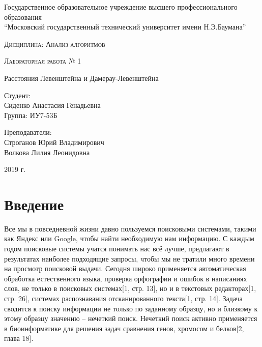 \documentclass[a4paper,14pt]{article} %
\newcommand{\anonsection}[1]{\section*{#1}\addcontentsline{toc}{section}{#1}}
\begin{document}
	\begin{titlepage}

       		\begin{center}
         		\large
		
        			Государственное образовательное учреждение высшего профессионального образования\\
       			“Московский государственный технический университет имени Н.Э.Баумана”
         		\vspace{3cm}
            
            		\textsc{Дисциплина: Анализ алгоритмов}
           		\vspace{0.5cm}
                
            		\textsc{Лабораторная работа № 1}
           		 \vspace{3cm}
            
           		 \LARGE 
		 
		 	Расстояния Левенштейна и Дамерау-Левенштейна
           		 \vspace{3cm}
            
            		\begin{flushright}
            			Студент: \\
				Сиденко Анастасия Генадьевна \\   
            			Группа: ИУ7-53Б \\
           			\hfill
            
           			Преподаватели: \\
				Строганов Юрий Владимирович \\
           			Волкова Лилия Леонидовна
            			\vfill
            		\end{flushright}
		
			\large
            		2019 г.
		\end{center}

	\end{titlepage}
    
	\tableofcontents
	
	\newpage
    
	\anonsection{Введение}
	\hfill
	
	Все мы в повседневной жизни давно пользуемся поисковыми системами, такими как Яндекс или Google, чтобы найти необходимую нам информацию. С каждым годом поисковые системы учатся понимать нас всё лучше, предлагают в результатах наиболее подходящие запросы, чтобы мы не тратили много времени на просмотр поисковой выдачи.
	Сегодня широко применяется автоматическая обработка естественного языка, проверка орфографии и ошибок в написаниях слов, не только в поисковых системах[1, стр. 13], но и в текстовых редакторах[1, стр. 26], системах распознавания отсканированного текста[1, стр. 14]. Задача сводится к поиску информации не только по заданному образцу, но и близкому к этому образцу значению -- нечеткий поиск. Нечеткий поиск активно применяется в биоинформатике для решения задач сравнения генов, хромосом и белков[2, глава 18].
        
\end{document}
